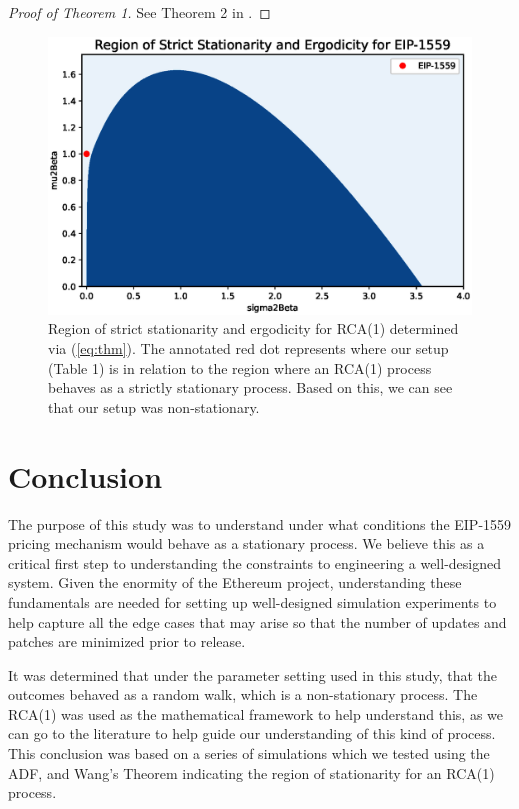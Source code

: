 \documentclass[futureinternet,article,submit,moreauthors,dvi2pdf]{mdpi}
\begin{document}
\begin{proof}[Proof of Theorem 1]
See Theorem 2 in \cite{Wan03}.
\end{proof}

\begin{figure}
\centering
\includegraphics[width = 12 cm]{strict_stationarity.eps}
\caption{Region of strict stationarity and ergodicity for RCA(1) determined via (\ref{eq:thm}). The annotated red dot represents where our setup (Table 1) is in relation to the region where an RCA(1) process behaves as a strictly stationary process. Based on this, we can see that our setup was non-stationary.} 
\label{fig:strict_stationarity}
\end{figure}  

\section{Conclusion}
\label{section:conclusion}

The purpose of this study was to understand under what conditions the EIP-1559 pricing mechanism would behave as a stationary process. We believe this as a critical first step to understanding the constraints to engineering a well-designed system. Given the enormity of the Ethereum project, understanding these fundamentals are needed for setting up well-designed simulation experiments to help capture all the edge cases that may arise so that the number of updates and patches are minimized prior to release.

It was determined that under the parameter setting used in this study, that the outcomes behaved as a random walk, which is a non-stationary process. The RCA(1) was used as the mathematical framework to help understand this, as we can go to the literature to help guide our understanding of this kind of process. This conclusion was based on a series of simulations which we tested using the ADF, and Wang's Theorem indicating the region of stationarity for an RCA(1) process. 
\end{document}

